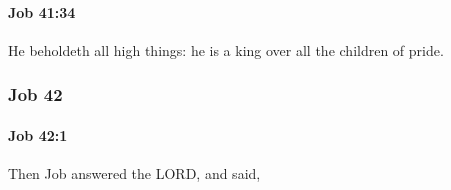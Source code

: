 		\paragraph{Job 41:34} %
			\label{JOB-41-34}

			He beholdeth all high things: he is a king over all the children of pride.

	\subsubsection{Job 42} %
		\label{JOB-42}

		\paragraph{Job 42:1} %
			\label{JOB-42-1}

			Then Job answered the LORD, and said,


